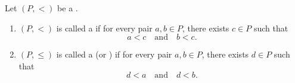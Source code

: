 \begin{definition} \label{definition:directed_codirected_strict_partially_ordered_set}
    Let $(P,<)$ be a . 
    \begin{enumerate}
        \item $(P, <)$ is called a  if for every pair $a,b \in P$, there exists $c \in P$ such that
        \[
        a < c \quad \text{and} \quad b < c.
        \]

        \item $(P, \leq)$ is called a  (or ) if for every pair $a,b \in P$, there exists $d \in P$ such that
        \[
        d < a \quad \text{and} \quad d < b.
        \]
    \end{enumerate}

\end{definition}
